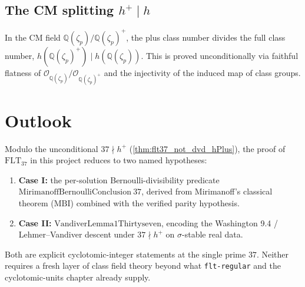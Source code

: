 \subsection*{The CM splitting $h^+ \mid h$}

\begin{theorem}
  \label{thm:hPlus_dvd_h}
  \leanok
  In the CM field $\mathbb Q(\zeta_p)/\mathbb Q(\zeta_p)^+$, the plus
  class number divides the full class number,
  $h(\mathbb Q(\zeta_p)^+) \mid h(\mathbb Q(\zeta_p))$.  This is
  proved unconditionally via faithful flatness of
  $\mathcal O_{\mathbb Q(\zeta_p)}/\mathcal O_{\mathbb Q(\zeta_p)^+}$
  and the injectivity of the induced map of class groups.
\end{theorem}

\section{Outlook}

Modulo the unconditional $37 \nmid h^+$
(\cref{thm:flt37_not_dvd_hPlus}), the proof of
$\mathrm{FLT}_{37}$ in this project reduces to two named hypotheses:

\begin{enumerate}
  \item \textbf{Case I:} the per-solution Bernoulli-divisibility
  predicate $\mathrm{MirimanoffBernoulliConclusion}\ 37$, derived
  from Mirimanoff's classical theorem ($\mathrm{MBI}$) combined with the
  verified parity hypothesis.
  \item \textbf{Case II:} $\mathrm{VandiverLemma1Thirtyseven}$, encoding
  the Washington 9.4 / Lehmer--Vandiver descent under $37 \nmid h^+$ on
  $\sigma$-stable real data.
\end{enumerate}

Both are explicit cyclotomic-integer statements at the single prime
$37$.  Neither requires a fresh layer of class field theory beyond what
\texttt{flt-regular} and the cyclotomic-units chapter already supply.
